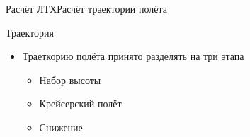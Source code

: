 \begin{frame}{Расчёт ЛТХ}{Расчёт траектории полёта}
    \begin{block}{Траектория}
    \begin{itemize}
        \item [] Траеткорию полёта принято разделять на три этапа 
            \begin{itemize}
                \item Набор высоты 
                \item Крейсерский полёт 
                \item Снижение 
            \end{itemize}
    \end{itemize}
    \end{block}
\end{frame}


 

